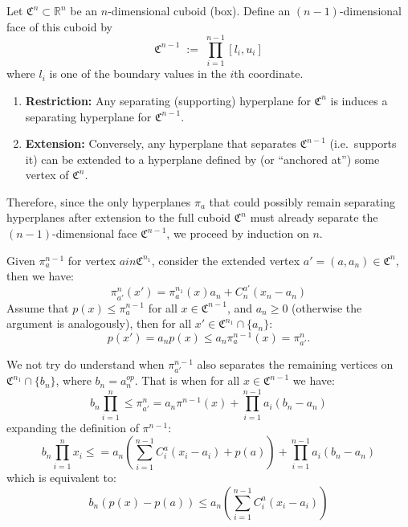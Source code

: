 \documentclass{article}
\begin{document}
Let $\mathfrak{C}^n \subset \mathbb{R}^n$ be an $n$-dimensional cuboid (box). 
Define an $(n-1)$-dimensional face of this cuboid by
\[
\mathfrak{C}^{n-1} \;:=\; \prod_{i=1}^{n-1}[l_i,u_i]
\]
where $l_i$ is one of the boundary values in the $i$th coordinate.

\begin{enumerate}
\item \textbf{Restriction:} Any separating (supporting) hyperplane for $\mathfrak{C}^n$ 
is induces a separating hyperplane for $\mathfrak{C}^{n-1}$.

\item \textbf{Extension:} Conversely, any hyperplane that separates 
$\mathfrak{C}^{n-1}$ (i.e.\ supports it) 
can be extended to a hyperplane defined by (or ``anchored at'') 
some vertex of $\mathfrak{C}^n$.
\end{enumerate}

\noindent
Therefore, since the only hyperplanes $\pi_a$ that could possibly remain separating hyperplanes after extension to the full cuboid $\mathfrak{C}^n$ must already separate the $(n-1)$-dimensional face $\mathfrak{C}^{n-1}$, 
we proceed by induction on $n$.
\par
Given \(\pi^{n-1}_{a}\) for vertex \(a in \mathfrak{C}^{n_1}\), consider the extended vertex \(a'=(a,a_n) \in \mathfrak{C}^{n}\), 
then we have:
\[
\pi^{n}_{a'}(x')= \pi_a^{n_1}(x)a_n+ C^{a'}_n (x_n-a_n)
\]
Assume that \(p(x) \leq \pi_{a}^{n-1}\) for all \(x \in \mathfrak{C}^{n-1}\), and \(a_n \geq 0\) (otherwise the argument is analogously), then for all \(x' \in \mathfrak{C}^{n_1} \cap \{a_n\}\):
\[
p(x') = a_n p(x) \leq a_n \pi_{a}^{n-1}(x) = \pi_{a'}^n.
\]

We not try do understand when \(\pi^{n-1}_{a'}\) also separates the remaining vertices on \(\mathfrak{C}^{n_1} \cap \{b_n\}\), where \(b_n = a^{op}_n\). That is when for all \(x \in \mathfrak{C}^{n-1}\) we have:
\[
b_n\prod_{i=1}^n \leq \pi^{n}_{a'} = a_n \pi^{n-1}(x) + \prod_{i=1}^{n-1}a_i(b_n-a_n)
\]
expanding the definition of \(\pi^{n-1}\):
\[
	b_n\prod_{i=1}^nx_i \leq = a_n (\sum_{i=1}^{n-1}C_i^a(x_i-a_i) + p(a)) + \prod_{i=1}^{n-1}a_i(b_n-a_n)
\]
which is equivalent to:
\begin{equation}
\label{eq: hyperplane extension}
b_n(p(x)-p(a)) \leq a_n(\sum_{i=1}^{n-1}C_i^a(x_i-a_i))
\end{equation}
\end{document}
